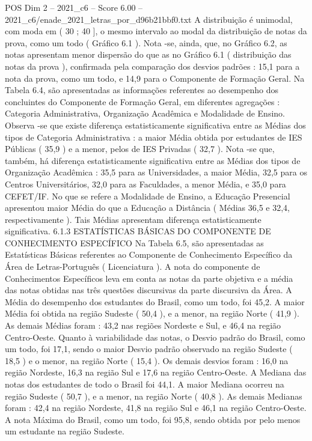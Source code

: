 \begin{textsample}{POS Dim 2 – 2021\_c6 – Score 6.00 – 2021\_c6/enade\_2021\_letras\_por\_d96b21bbf0.txt}
A distribuição é unimodal, com moda em ( 30 ; 40 ], o mesmo intervalo ao modal da distribuição de notas da prova, como um todo ( Gráfico 6.1 ).
Nota -se, ainda, que, no Gráfico 6.2, as notas apresentam menor dispersão do que as no Gráfico 6.1 ( distribuição das notas da prova ), confirmada pela comparação dos desvios padrões : 15,1 para a nota da prova, como um todo, e 14,9 para o Componente de Formação Geral.
Na Tabela 6.4, são apresentadas as informações referentes ao desempenho dos concluintes do Componente de Formação Geral, em diferentes agregações : Categoria Administrativa, Organização Acadêmica e Modalidade de Ensino.
Observa -se que existe diferença estatisticamente significativa entre as Médias dos tipos de Categoria Administrativa : a maior Média obtida por estudantes de IES Públicas ( 35,9 ) e a menor, pelos de IES Privadas ( 32,7 ).
Nota -se que, também, há diferença estatisticamente significativa entre as Médias dos tipos de Organização Acadêmica : 35,5 para as Universidades, a maior Média, 32,5 para os Centros Universitários, 32,0 para as Faculdades, a menor Média, e 35,0 para CEFET/IF.
No que se refere a Modalidade de Ensino, a Educação Presencial apresentou maior Média do que a Educação a Distância ( Médias 36,5 e 32,4, respectivamente ).
Tais Médias apresentam diferença estatisticamente significativa. 6.1.3 ESTATÍSTICAS BÁSICAS DO COMPONENTE DE CONHECIMENTO ESPECÍFICO Na Tabela 6.5, são apresentadas as Estatísticas Básicas referentes ao Componente de Conhecimento Específico da Área de Letras-Português ( Licenciatura ).
A nota do componente de Conhecimentos Específicos leva em conta as notas da parte objetiva e a média das notas obtidas nas três questões discursivas da parte discursiva da Área.
A Média do desempenho dos estudantes do Brasil, como um todo, foi 45,2.
A maior Média foi obtida na região Sudeste ( 50,4 ), e a menor, na região Norte ( 41,9 ).
As demais Médias foram : 43,2 nas regiões Nordeste e Sul, e 46,4 na região Centro-Oeste.
Quanto à variabilidade das notas, o Desvio padrão do Brasil, como um todo, foi 17,1, sendo o maior Desvio padrão observado na região Sudeste ( 18,5 ) e o menor, na região Norte ( 15,4 ).
Os demais desvios foram : 16,0 na região Nordeste, 16,3 na região Sul e 17,6 na região Centro-Oeste.
A Mediana das notas dos estudantes de todo o Brasil foi 44,1.
A maior Mediana ocorreu na região Sudeste ( 50,7 ), e a menor, na região Norte ( 40,8 ).
As demais Medianas foram : 42,4 na região Nordeste, 41,8 na região Sul e 46,1 na região Centro-Oeste.
A nota Máxima do Brasil, como um todo, foi 95,8, sendo obtida por pelo menos um estudante na região Sudeste.

\end{textsample}
